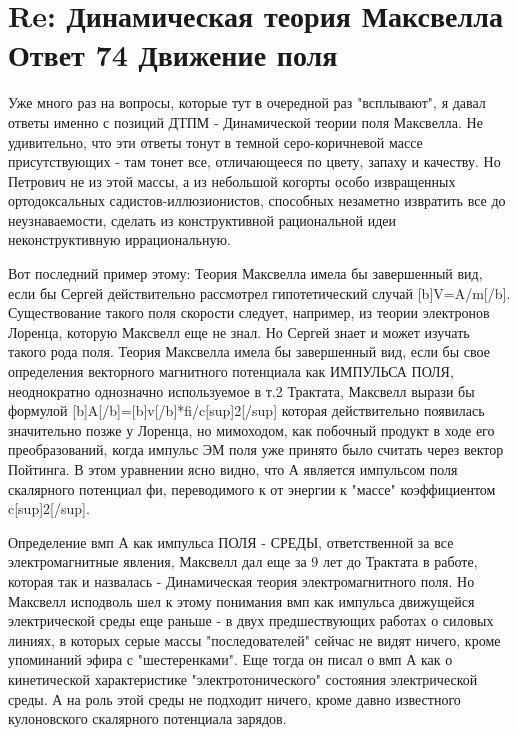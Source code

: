 \documentclass{article}
\begin{document}
\section{Re: Динамическая теория Максвелла Ответ 74  Движение поля}
Уже много раз  на вопросы, которые тут в очередной раз "всплывают", я давал  ответы именно с позиций ДТПМ - Динамической теории поля Максвелла.
Не удивительно, что эти ответы тонут в темной серо-коричневой массе присутствующих - там тонет все, отличающееся по цвету, запаху и качеству.
Но Петрович не из этой массы, а из небольшой когорты особо извращенных ортодоксальных садистов-иллюзионистов, способных незаметно извратить все до неузнаваемости, сделать из конструктивной рациональной идеи неконструктивную иррациональную.

Вот последний пример этому:
Теория Максвелла имела бы завершенный вид, если бы Сергей действительно рассмотрел гипотетический случай
[b]V=A/m[/b].
Существование такого поля скорости следует, например, из теории электронов Лоренца, которую Максвелл еще не знал.  Но Сергей знает и может изучать такого рода поля. %
Теория Максвелла имела бы завершенный вид, если бы свое определения векторного магнитного потенциала как ИМПУЛЬСА ПОЛЯ, неоднократно  однозначно используемое в т.2 Трактата, Максвелл вырази бы формулой
[b]A[/b]=[b]v[/b]*fi/c[sup]2[/sup]
которая действительно появилась значительно позже у Лоренца, но мимоходом, как побочный продукт в ходе его преобразований, когда импульс ЭМ поля уже принято было считать через вектор Пойтинга.
В этом уравнении ясно видно, что А является импульсом поля скалярного потенциал фи, переводимого к от энергии к "массе" коэффициентом c[sup]2[/sup]. 

Определение вмп А как импульса ПОЛЯ - СРЕДЫ, ответственной за все электромагнитные явления, Максвелл дал еще за 9 лет до Трактата в работе, которая так и назвалась - Динамическая теория электромагнитного поля.
Но Максвелл исподволь шел к этому понимания вмп как импульса движущейся электрической среды еще раньше - в двух предшествующих работах о силовых линиях, в которых серые массы "последователей" сейчас не видят ничего, кроме упоминаний эфира с "шестеренками". Еще тогда он писал о вмп А как о кинетической характеристике "электротонического" состояния электрической среды.
А на роль  этой среды не подходит ничего, кроме давно известного кулоновского скалярного потенциала зарядов.
\end{document}
